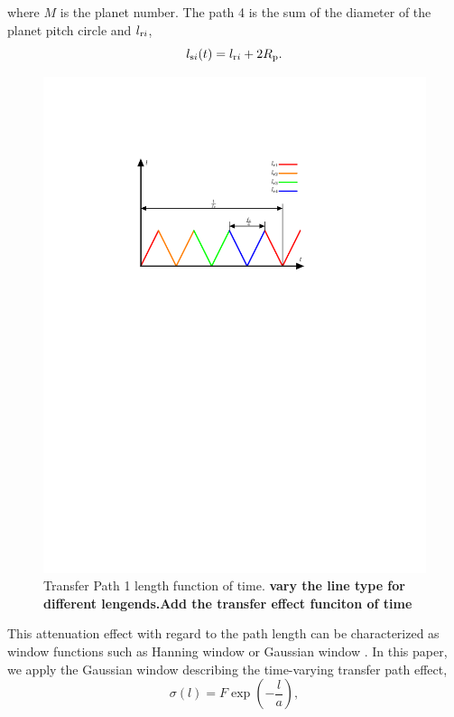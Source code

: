 \documentclass[a4paper,fleqn]{cas-sc}%
\begin{document}
where $M$ is the planet number. The path 4 is the sum of the diameter of the planet pitch circle and $l_{{\rm r}i}$,
\begin{equation}
    l_{{\rm s}i}(t)=l_{{\rm r}i}+2 R_{\rm p}. \label{eq:path_4_length}
\end{equation}
\begin{figure}[pos=htbp]
    \centering
    \includegraphics[scale=0.5]{trangle_wave.pdf}
    \caption{Transfer Path 1 length function of time. \textbf{vary the line type for different lengends.Add the transfer effect funciton of time}}
    \label{fig:path_length_trangle_wave}
\end{figure}
\par This attenuation effect with regard to the path length can be characterized as window functions such as Hanning window or Gaussian window \cite{Mark2009}. In this paper, we apply the Gaussian window describing the time-varying transfer path effect,
\begin{equation}
    \sigma(l)=F\exp\left(-\frac{l}{a}\right),\label{eq:general_transfer_path}
\end{equation}
\end{document}
